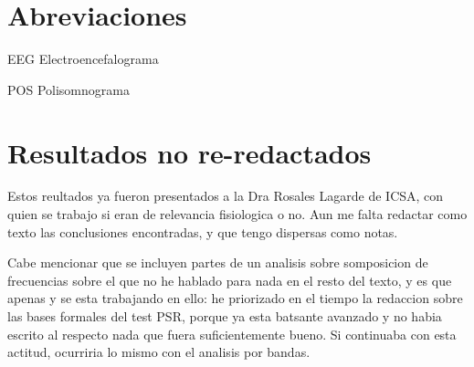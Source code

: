 \documentclass[12pt,a4paper]{mitthesis}
\newcommand{\abbrlabel}[1]{\makebox[3cm][l]{\textbf{#1}\ \dotfill}}
\newenvironment{abbreviations}{\begin{list}{}{\renewcommand{\makelabel}{\abbrlabel}}}{\end{list}}
\begin{document}

%


\tableofcontents
\newpage


\chapter*{Abreviaciones}

\begin{abbreviations}
\item[EEG] Electroencefalograma
\item[POS] Polisomnograma
\end{abbreviations}


















\appendix

\chapter{Resultados no re-redactados}

Estos reultados ya fueron presentados a la Dra Rosales Lagarde de ICSA, con quien se
trabajo si eran de relevancia fisiologica o no. Aun me falta redactar como texto las conclusiones
encontradas, y que tengo dispersas como notas. 

Cabe mencionar que se incluyen partes de un analisis
sobre somposicion de frecuencias sobre el que no he hablado para nada en el resto del texto,
y es que apenas y se esta trabajando en ello: he priorizado en el tiempo la redaccion
sobre  las bases
formales del test PSR, porque ya esta batsante avanzado y no habia escrito al respecto nada que fuera
suficientemente bueno. Si continuaba con esta actitud, ocurriria lo mismo con el analisis por bandas.
\end{document}

